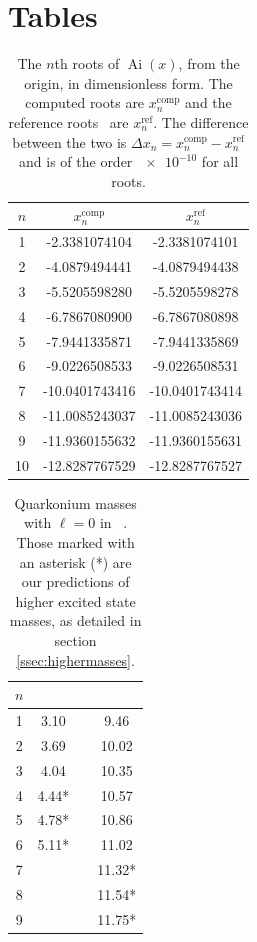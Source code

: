 \documentclass[]{article}
\newcommand{\Ai}[1]{\ensuremath{\operatorname{Ai}({#1})}}
\begin{document}
\section{Tables}

\begin{table}[H]
	\begin{center}
		\begin{tabular}{ c c c }
			$n$ & $x_{n}^{\mathrm{comp}}$ & $x_{n}^{\mathrm{ref}}$\\
			\hline
			1  & -2.3381074104  & -2.3381074101 \\
			2  & -4.0879494441  & -4.0879494438 \\
			3  & -5.5205598280  & -5.5205598278 \\
			4  & -6.7867080900  & -6.7867080898 \\
			5  & -7.9441335871  & -7.9441335869 \\
			6  & -9.0226508533  & -9.0226508531 \\
			7  & -10.0401743416 & -10.0401743414\\
			8  & -11.0085243037 & -11.0085243036\\
			9  & -11.9360155632 & -11.9360155631\\
			10 & -12.8287767529 & -12.8287767527
		\end{tabular}
		\caption{The $n$th roots of \Ai{x}, from the origin, in dimensionless form. The computed roots are $x_{n}^{\mathrm{comp}}$ and the reference roots~\cite{ref:abramowitz} are $x_{n}^{\mathrm{ref}}$. The difference between the two is $\Delta x_{n} = x_{n}^{\mathrm{comp}} - x_{n}^{\mathrm{ref}}$ and is of the order $\num{e-10}$ for all roots.}
		\label{tab:roots}
	\end{center}
\end{table}

\begin{table}[H]
	\begin{center}
		\begin{tabular}{ c c c c }
			$n$ & \ccbar & & \bbbar\\
			\hline
			1 & 3.10  & & 9.46 \\
			2 & 3.69  & & 10.02\\
			3 & 4.04  & & 10.35\\
			4 & 4.44* & & 10.57\\
			5 & 4.78* & & 10.86\\
			6 & 5.11* & & 11.02\\
			7 &       & & 11.32*\\
			8 &       & & 11.54*\\
			9 &       & & 11.75*\\
		\end{tabular}
		\caption{Quarkonium masses with $\ell = 0$ in \GeV~\cite{ref:gdaniell}. Those marked with an asterisk (*) are our predictions of higher excited state masses, as detailed in section \ref{ssec:highermasses}.}
		\label{tab:mesonmasses}
	\end{center}  
\end{table}
\end{document}
